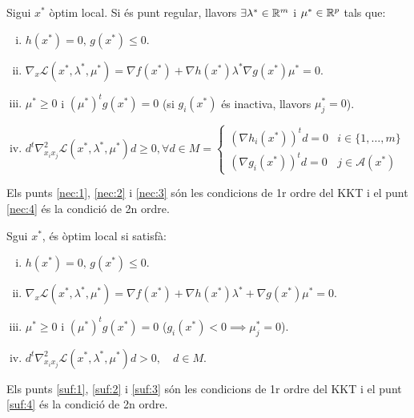 \begin{prop}
    Sigui $x^*$ \`optim local. Si \'es punt regular, llavors $\exists \lambda^* \in \mathbb{R}^m$ i $\mu^* \in \mathbb{R}^p$ tals que:
    \begin{enumerate}[i)]
        \item \label{nec:1} $h\left( x^* \right) = 0,\, g\left( x^* \right) \leq 0$.
        \item \label{nec:2} $\nabla_x \mathcal{L}\left( x^*, \lambda^*, \mu^* \right) = \nabla f\left( x^* \right) + \nabla h\left( x^* \right) \lambda^* \nabla g\left( x^* \right)\mu^* = 0$.
        \item \label{nec:3} $\mu^* \geq 0$ i $\left( \mu^* \right)^t g\left( x^* \right) = 0$ (si $g_i\left( x^* \right)$ \'es inactiva, llavors $\mu_j^* = 0$).
        \item \label{nec:4} $d^t \nabla_{x_ix_j}^2 \mathcal{L} \left( x^*, \lambda^*, \mu^* \right) d \geq 0, \forall d\in M =
            \begin{cases}
                \left( \nabla h_i\left( x^* \right) \right)^t d = 0 & i \in \{1,\dots,m\} \\
                \left( \nabla g_i\left( x^* \right) \right)^t d = 0 & j \in \mathcal{A}\left( x^* \right)
            \end{cases}$
    \end{enumerate}
    Els punts \ref{nec:1}, \ref{nec:2} i \ref{nec:3} s\'on les condicions de 1r ordre del KKT i el punt \ref{nec:4} \'es la condici\'o de 2n ordre.
\end{prop}
\begin{prop}
    Sgui $x^*$, \'es \`optim local si satisf\`a:
    \begin{enumerate}[i)]
        \item \label{suf:1} $h\left( x^* \right) = 0,\, g\left( x^* \right) \leq 0$.
        \item \label{suf:2} $\nabla_x \mathcal{L} \left( x^*, \lambda^*, \mu^* \right) = \nabla f\left( x^* \right) + \nabla h\left( x^* \right)\lambda^* + \nabla g\left( x^* \right)\mu^* = 0$.
        \item \label{suf:3} $\mu^* \geq 0$ i $\left( \mu^* \right)^t g\left( x^* \right) = 0$ ($g_i\left( x^* \right) < 0 \implies \mu_j^* = 0$).
        \item \label{suf:4} $d^t \nabla_{x_ix_j}^2 \mathcal{L}\left( x^*, \lambda^*, \mu^* \right) d > 0, \quad d \in M$.
    \end{enumerate}
    Els punts \ref{suf:1}, \ref{suf:2} i \ref{suf:3} s\'on les condicions de 1r ordre del KKT i el punt \ref{suf:4} \'es la condici\'o de 2n ordre.
\end{prop}
